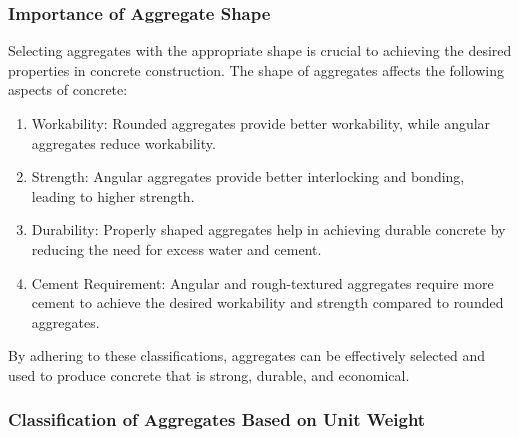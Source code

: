 \documentclass[a4paper,11pt]{book}
\begin{document}
\subsubsection{Importance of Aggregate Shape}
Selecting aggregates with the appropriate shape is crucial to achieving the desired properties in concrete construction.
The shape of aggregates affects the following aspects of concrete:
\begin{enumerate}
     

\item Workability: Rounded aggregates provide better workability, while angular aggregates reduce workability.
\item Strength: Angular aggregates provide better interlocking and bonding, leading to higher strength.
\item Durability: Properly shaped aggregates help in achieving durable concrete by reducing the need for excess water and cement.
\item Cement Requirement: Angular and rough-textured aggregates require more cement to achieve the desired workability and strength compared to rounded aggregates.
\end{enumerate}


By adhering to these classifications, aggregates can be effectively selected and used to produce concrete that is strong, durable, and economical.
\subsubsection{Classification of Aggregates Based on Unit Weight}
\end{document}
